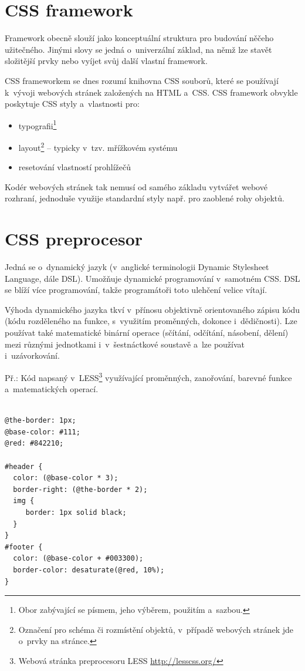 \documentclass[thesis=B,czech]{FITthesis}[2012/06/26]
\begin{document}
\section{CSS framework}


Framework obecně slouží jako konceptuální struktura pro budování něčeho užitečného. Jinými slovy se jedná o~univerzální základ, na němž lze stavět složitější prvky nebo vyíjet svůj další vlastní framework. 

\gls{CSS} frameworkem se dnes rozumí knihovna CSS souborů, které se používají k~vývoji webových stránek založených na HTML a~CSS. CSS framework obvykle poskytuje CSS styly a~vlastnosti pro:

\begin{itemize}
 \item typografii\footnote{Obor zabývající se písmem, jeho výběrem, použitím a~sazbou.}
 \item layout\footnote{Označení pro schéma či rozmístění objektů, v~případě webových stránek jde o~prvky na stránce.} -- typicky v~tzv. mřížkovém systému
 \item resetování vlastností prohlížečů\cite{fram}
\end{itemize}
Kodér webových stránek tak nemusí od samého základu vytvářet webové rozhraní, jednoduše využije standardní styly např. pro zaoblené rohy objektů. 

\section{CSS preprocesor}

Jedná se o~dynamický jazyk (v~anglické terminologii Dynamic Stylesheet Language, dále DSL). Umožňuje dynamické programování v~samotném CSS. DSL se blíží více programování, takže programátoři toto ulehčení velice vítají.

Výhoda dynamického jazyka tkví v~přínosu objektivně orientovaného zápisu kódu (kódu rozděleného na funkce, s~využitím proměnných, dokonce i~dědičnosti). Lze používat také matematické binární operace (sčítání, odčítání, násobení, dělení) mezi různými jednotkami i~v~šestnáctkové soustavě a~lze používat i~uzávorkování. 


\noindent Př.: Kód napsaný v~LESS\footnote{Webová stránka preprocesoru LESS \url{http://lesscss.org/}} využívající proměnných, zanořování, barevné funkce a~matematických operací.
\scriptsize
\begin{verbatim}

@the-border: 1px;
@base-color: #111;
@red: #842210;

#header {
  color: (@base-color * 3);
  border-right: (@the-border * 2);
  img {
     border: 1px solid black;  
  }
}
#footer {
  color: (@base-color + #003300);
  border-color: desaturate(@red, 10%);
}
\end{verbatim}
\normalsize
\end{document}
